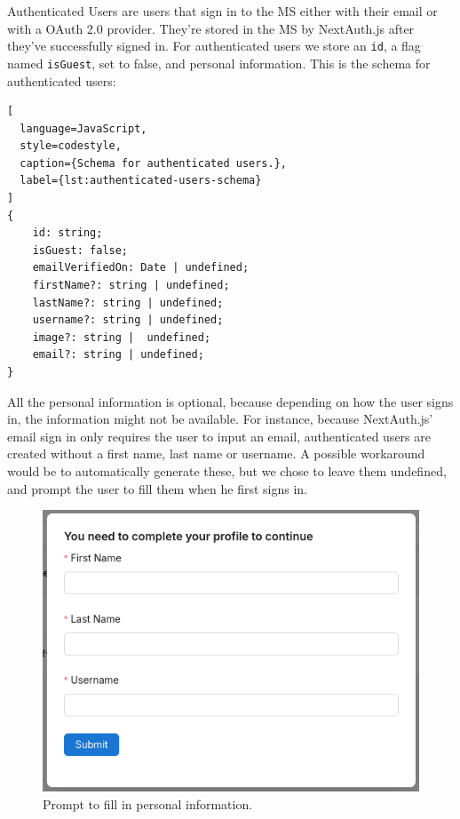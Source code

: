 Authenticated Users are users that sign in to the MS either with their email or with a
OAuth 2.0 provider.
They're stored in the MS by NextAuth.js after they've successfully signed in.
For authenticated users we store an \lstinline{id}, a flag named \lstinline{isGuest}, set
to false, and personal information.
This is the schema for authenticated users:


\begin{lstlisting}[
  language=JavaScript,
  style=codestyle,
  caption={Schema for authenticated users.},
  label={lst:authenticated-users-schema}
]
{
    id: string;
    isGuest: false;
    emailVerifiedOn: Date | undefined;
    firstName?: string | undefined;
    lastName?: string | undefined;
    username?: string | undefined;
    image?: string |  undefined;
    email?: string | undefined;
}

\end{lstlisting}

All the personal information is optional, because depending on how the user signs in, the
information might not be available.
For instance, because NextAuth.js' email sign in only requires the user to input an
email, authenticated users are created without a first name, last name or username.
A possible workaround would be to automatically generate these, but we chose to leave them
undefined, and prompt the user to fill them when he first signs in.


\begin{figure}[H]
	\centering
	\includegraphics[scale=0.4]{images/fill-data-prompt.png}
	\caption{Prompt to fill in personal information.}
	\vspace{-1em} %
	\label{fig:prompt-fill-personal-information}
\end{figure}

